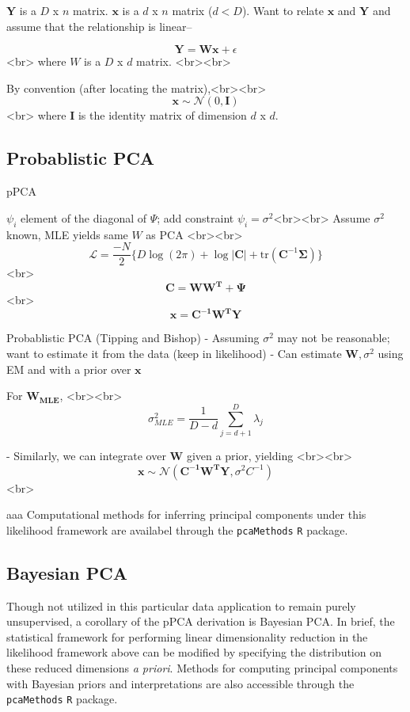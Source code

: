 \documentclass[english, 11pt]{article}\usepackage[]{graphicx}\usepackage[]{color}
\begin{document}
$\mathbf{Y}$ is a $D$ x $n$ matrix. $\mathbf{x}$ is a $d$ x $n$ matrix ($d < D$). Want to relate $\mathbf{x}$ and $\mathbf{Y}$ and assume that the relationship is linear--

$$ \mathbf{Y = Wx} + \epsilon$$<br>
where $W$ is a $D$ x $d$ matrix. <br><br>

By convention (after locating the matrix),<br><br> $$\mathbf{x} \sim \mathcal{N} (0, \mathbf{I})$$<br>
where $\mathbf{I}$ is the identity matrix of dimension $d$ x $d$. 

\subsection{Probablistic PCA}

pPCA \cite{tipping1999probabilistic}

$\psi_i$ element of the diagonal of $\Psi$; add constraint $\psi_i = \sigma^2$<br><br>
Assume $\sigma^2$ known, MLE yields same $W$ as PCA <br><br>
$$  \mathcal{L} = \frac{-N}{2}\{ D\log(2\pi) + \log|\mathbf{C}| + \textrm{tr}(\mathbf{C}^{-1}\mathbf{\Sigma})  \}   $$<br>
$$\mathbf{C} = \mathbf{WW^T }+ \mathbf{\Psi} $$ <br>
$$  \mathbf{x} = \mathbf{C^{-1}W^{T}Y}$$

Probablistic PCA (Tipping and Bishop)
- Assuming $\sigma^2$ may not be reasonable; want to estimate it from the data (keep in likelihood)
- Can estimate $\mathbf{W}, \sigma^2$ using EM and with a prior over $\mathbf{x}$

For  $\mathbf{W_{\textrm{MLE}}}$, <br><br> $$\sigma_{MLE}^2 = \frac{1}{D-d} \sum_{j = d +1}^D \lambda_j $$

- Similarly, we can integrate over $\mathbf{W}$ given a prior, yielding <br><br>
$$  \mathbf{x} \sim  \mathcal{N} (\mathbf{C^{-1}W^{T}Y}, \sigma^2C^{-1})$$ <br>

aaa \newline \newline
\noindent Computational methods for inferring principal components under this likelihood framework are availabel through the \texttt{pcaMethods} \texttt{R} package.

\subsection{Bayesian PCA}
Though not utilized in this particular data application to remain purely unsupervised, a corollary of the pPCA derivation is Bayesian PCA. In brief, the statistical framework for performing linear dimensionality reduction in the likelihood framework above can be modified by specifying the distribution on these reduced dimensions \textit{a priori}. \cite{bishop1999bayesian} Methods for computing principal components with Bayesian priors and interpretations are also accessible through the \texttt{pcaMethods} \texttt{R} package.
\end{document}
